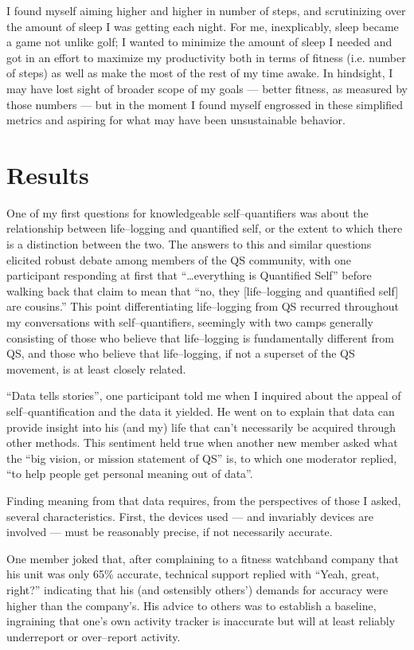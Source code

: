 \documentclass{article}
\begin{document}
I found myself aiming higher and higher in number of steps,
and scrutinizing over the amount of sleep I was getting each night.
For me,
inexplicably,
sleep became a game not unlike golf;
I wanted to minimize the amount of sleep I needed and got in an effort to maximize my productivity both in terms of fitness (i.e.
number of steps) as well as make the most of the rest of my time awake.
In hindsight,
I may have lost sight of broader scope of my goals
--- better fitness,
as measured by those numbers
--- but in the moment I found myself engrossed in these simplified metrics and aspiring for what may have been unsustainable behavior.

\section*{Results}
One of my first questions for knowledgeable self--quantifiers was about the relationship between life--logging and quantified self,
or the extent to which there is a distinction between the two.
The answers to this and similar questions elicited robust debate among members of the QS community,
with one participant responding at first that ``\dots everything is Quantified Self'' before walking back that claim to mean that ``no,
they [life--logging and quantified self] are cousins.'' This point differentiating life--logging from QS recurred throughout my conversations with self--quantifiers,
seemingly with two camps generally consisting of those who believe that life--logging is fundamentally different from QS,
and those who believe that life--logging,
if not a superset of the QS movement,
is at least closely related.

``Data tells stories'',
one participant told me when I inquired about the appeal of self--quantification and the data it yielded.
He went on to explain that data can provide insight into his (and my) life that can't necessarily be acquired through other methods.
This sentiment held true when another new member asked what the ``big vision,
or mission statement of QS'' is,
to which one moderator replied,
``to help people get personal meaning out of data''.

Finding meaning from that data requires,
from the perspectives of those I asked,
several characteristics.
First,
the devices used
--- and invariably devices are involved ---
must be reasonably precise,
if not necessarily accurate.

One member joked that,
after complaining to a fitness watchband company that his unit was only 65\% accurate,
technical support replied with ``Yeah,
great,
right?'' indicating that his (and ostensibly others') demands for accuracy were higher than the company's.
His advice to others was to establish a baseline,
ingraining that one's own activity tracker is inaccurate but will at least reliably underreport or over--report activity.
\end{document}
